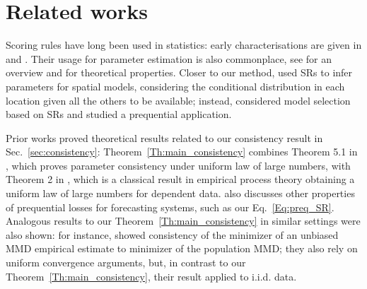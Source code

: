 \documentclass[twoside,11pt]{article}
\begin{document}
	
	
	
	
	\section{Related works}\label{sec:related_works}
	
	Scoring rules have long been used in statistics: early characterisations are given in \cite{mccarthy1956measures} and \cite{savage1971elicitation}. Their usage for parameter estimation is also commonplace, see \cite{gneiting2007strictly} for an overview and \cite{dawid2016minimum} for theoretical properties.
	Closer to our method, \citet{dawid2013estimation} used SRs to infer parameters for spatial models, considering the conditional distribution in each location given all the others to be available; instead, \citet{dawid2015bayesian} considered model selection based on SRs and studied a prequential application. 
	
	Prior works proved theoretical results related to our consistency result in Sec.~\ref{sec:consistency}: Theorem~\ref{Th:main_consistency} combines Theorem 5.1 in \cite{skouras1998optimal}, which proves parameter consistency under uniform law of large numbers, with Theorem 2 in \cite{potscher1989uniform}, which is a classical result in empirical process theory obtaining a uniform law of large numbers for dependent data. \citet{skouras1998optimal} also discusses other properties of prequential losses for forecasting systems, such as our Eq.~\eqref{Eq:preq_SR}. Analogous results to our Theorem~\ref{Th:main_consistency} in similar settings were also shown: for instance, \cite{dziugaite2015training} showed consistency of the minimizer of an unbiased MMD empirical estimate to minimizer of the population MMD; they also rely on uniform convergence arguments, but, in contrast to our  Theorem~\ref{Th:main_consistency}, their result applied to i.i.d. data.
	
\end{document}
